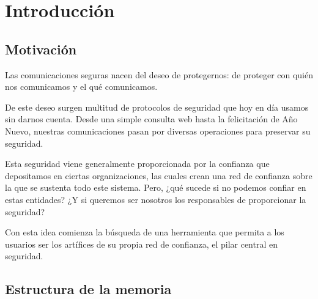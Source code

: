 
\chapter{Introducción} %

\label{Chapter1} %


\section{Motivación}

Las comunicaciones seguras nacen del deseo de protegernos: de proteger con quién nos comunicamos y el qué comunicamos.

De este deseo surgen multitud de protocolos de seguridad que hoy en día usamos sin darnos cuenta. Desde una simple consulta web hasta la felicitación de Año Nuevo, nuestras comunicaciones pasan por diversas operaciones para preservar su seguridad.

Esta seguridad viene generalmente proporcionada por la confianza que depositamos en ciertas organizaciones, las cuales crean una red de confianza sobre la que se sustenta todo este sistema. Pero, ¿qué sucede si no podemos confiar en estas entidades? ¿Y si queremos ser nosotros los responsables de proporcionar la seguridad?

Con esta idea comienza la búsqueda de una herramienta que permita a los usuarios ser los artífices de su propia red de confianza, el pilar central en seguridad.


\section{Estructura de la memoria}
